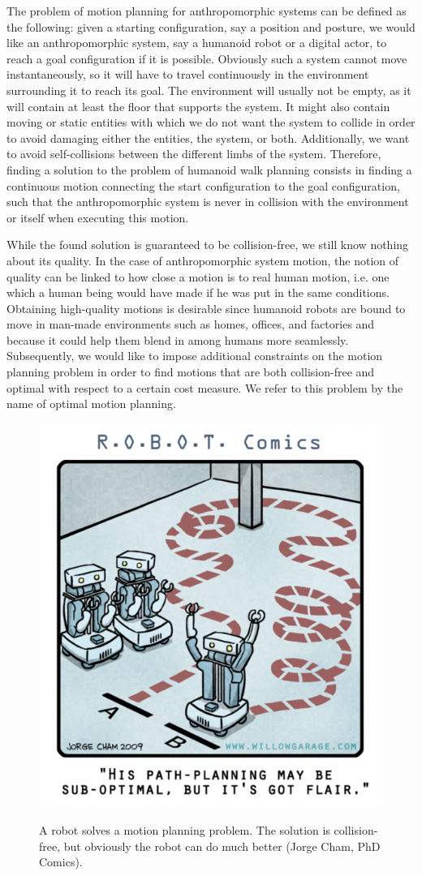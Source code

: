 The problem of motion planning for anthropomorphic systems can be
defined as the following: given a starting configuration, say a
position and posture, we would like an anthropomorphic system, say a
humanoid robot or a digital actor, to reach a goal configuration if it
is possible. Obviously such a system cannot move instantaneously, so
it will have to travel continuously in the environment surrounding it
to reach its goal. The environment will usually not be empty, as it
will contain at least the floor that supports the system. It might
also contain moving or static entities with which we do not want the
system to collide in order to avoid damaging either the entities, the
system, or both. Additionally, we want to avoid self-collisions
between the different limbs of the system. Therefore, finding a
solution to the problem of humanoid walk planning consists in finding
a continuous motion connecting the start configuration to the goal
configuration, such that the anthropomorphic system is never in
collision with the environment or itself when executing this motion.

While the found solution is guaranteed to be collision-free, we still
know nothing about its quality. In the case of anthropomorphic system
motion, the notion of quality can be linked to how close a motion is
to real human motion, i.e. one which a human being would have made if
he was put in the same conditions. Obtaining high-quality motions is
desirable since humanoid robots are bound to move in man-made
environments such as homes, offices, and factories and because it
could help them blend in among humans more seamlessly. Subsequently,
we would like to impose additional constraints on the motion planning
problem in order to find motions that are both collision-free and
optimal with respect to a certain cost measure. We refer to this
problem by the name of optimal motion planning.

\begin{figure}[h!]
  \centering
      {\includegraphics[width = 0.6\linewidth]
        {src/chap0-introduction/optimal-motion-planning.png}}
      \caption{A robot solves a motion planning problem. The solution
        is collision-free, but obviously the robot can do much better
        (Jorge Cham, PhD Comics).}
      \label{fig:chap0-optimal-motion-planning}
\end{figure}

